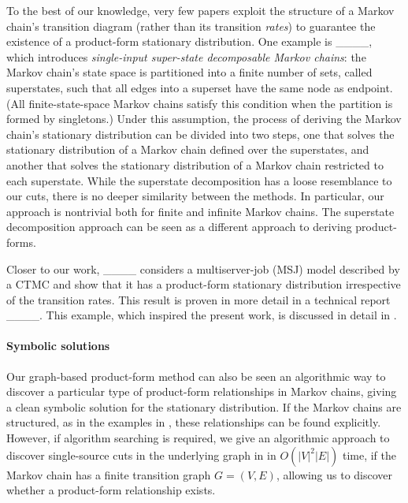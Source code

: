 To the best of our knowledge,
very few papers exploit the structure
of a Markov chain's transition diagram
(rather than its transition \emph{rates})
to guarantee the existence of a product-form stationary distribution.
One example is ____, which introduces
\textit{single-input super-state decomposable Markov chains}:
the Markov chain's state space is partitioned into a finite number of sets,
called superstates,
such that all edges into a superset
have the same node as endpoint.
(All finite-state-space Markov chains satisfy this condition
when the partition is formed by singletons.)
Under this assumption, the process of deriving the Markov chain's stationary distribution
can be divided into two steps,
one that solves the stationary distribution
of a Markov chain defined over the superstates,
and another that solves the stationary distribution
of a Markov chain restricted to each superstate.
While the superstate decomposition has a loose resemblance to our cuts,
there is no deeper similarity between the methods.
In particular,
our approach is nontrivial both for finite and infinite Markov chains.
The superstate decomposition approach can be seen as a different approach to deriving product-forms.

Closer to our work,
____ considers a multiserver-job (MSJ) model
described by a CTMC
and show that it has a product-form stationary distribution
irrespective of the transition rates.
This result is proven in more detail in a technical report ____.
This example, which inspired the present work,
is discussed in detail in .



\paragraph*{Symbolic solutions}

Our graph-based product-form method
can also be seen an algorithmic way to discover a particular
type of product-form relationships in Markov chains, giving a clean symbolic solution for the stationary distribution.
If the Markov chains are structured, as in the examples in , these relationships can be found explicitly.
However, if algorithm searching is required, we give an algorithmic approach to discover single-source cuts in the underlying graph in  in $O(|V|^2 |E|)$ time, if the Markov chain has a finite transition graph $G = (V, E)$, allowing us to discover whether a product-form relationship exists.

